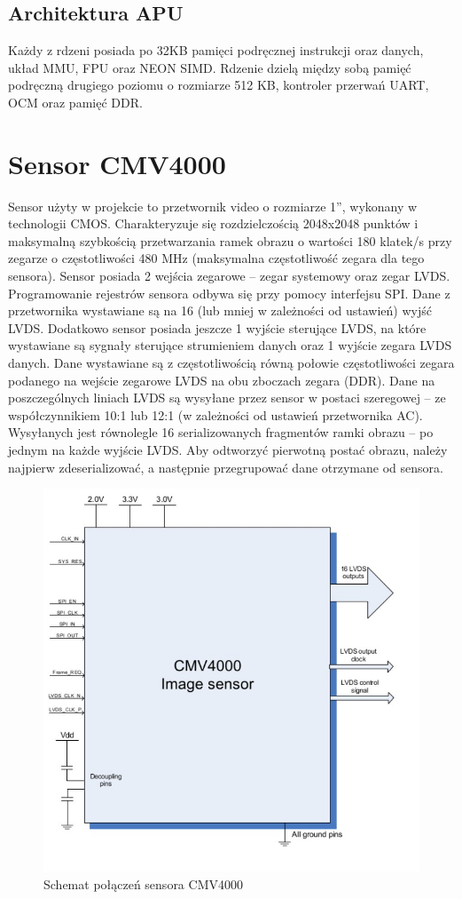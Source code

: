 \documentclass[a4paper,11pt,oneside]{report}  %
\begin{document}
\subsection{Architektura APU}
Każdy z rdzeni posiada po 32KB pamięci podręcznej instrukcji oraz danych, układ MMU, FPU oraz NEON SIMD. Rdzenie dzielą między sobą pamięć podręczną drugiego poziomu o rozmiarze 512 KB, kontroler przerwań UART, OCM oraz pamięć DDR.
\section{Sensor CMV4000}
Sensor użyty w projekcie to przetwornik video o rozmiarze 1”, wykonany w technologii CMOS. Charakteryzuje się rozdzielczością 2048x2048 punktów i maksymalną szybkością przetwarzania ramek obrazu o wartości 180 klatek/s przy zegarze o częstotliwości 480 MHz (maksymalna częstotliwość zegara dla tego sensora). Sensor posiada 2 wejścia zegarowe – zegar systemowy oraz zegar LVDS. Programowanie rejestrów sensora odbywa się przy pomocy interfejsu SPI. Dane z przetwornika wystawiane są na 16 (lub mniej w zależności od ustawień) wyjść LVDS. Dodatkowo sensor posiada jeszcze 1 wyjście sterujące LVDS, na które wystawiane są sygnały sterujące strumieniem danych oraz 1 wyjście zegara LVDS danych. Dane wystawiane są z częstotliwością równą połowie częstotliwości zegara podanego na wejście zegarowe LVDS na obu zboczach zegara (DDR). Dane na poszczególnych liniach LVDS są wysyłane przez sensor w postaci szeregowej – ze współczynnikiem 10:1 lub 12:1 (w zależności od ustawień przetwornika AC). Wysyłanych jest równolegle 16 serializowanych fragmentów ramki obrazu – po jednym na każde wyjście LVDS. Aby odtworzyć pierwotną postać obrazu, należy najpierw zdeserializować, a następnie przegrupować dane otrzymane od sensora.

\begin{figure}[H]
	\centering
	\includegraphics[width=13cm]{cmv4000.png}
	\caption{Schemat połączeń sensora CMV4000}
	\label{fig:CMV4000}
\end{figure}
\end{document}
